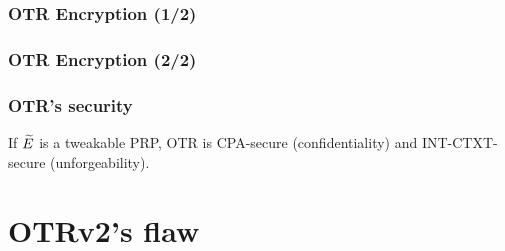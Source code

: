 \documentclass{beamer}
\begin{document}
	

	\begin{frame}
		\frametitle{OTR Encryption (1/2)}
		\begin{center}
			\begin{tikzpicture}[
				scale=1,
				node distance=1.8cm,
				line width = 0.5pt,
				]
				
			\end{tikzpicture}
			\end{center}		
		\end{frame}

		\begin{frame}
			\frametitle{OTR Encryption (2/2)}
			\begin{center}

				
				\end{center}		
			\end{frame}


			\begin{frame}
				\frametitle{OTR's security}
				\begin{theorem}[{Theorem 3 of [Min14]}]
					If $\tE$ is a tweakable PRP, OTR is CPA-secure (confidentiality) and INT-CTXT-secure (unforgeability).
				\end{theorem}

			\end{frame}
	

			\section{OTRv2's flaw} %
			\label{sec:otrv2_s_flaw}
\end{document}
